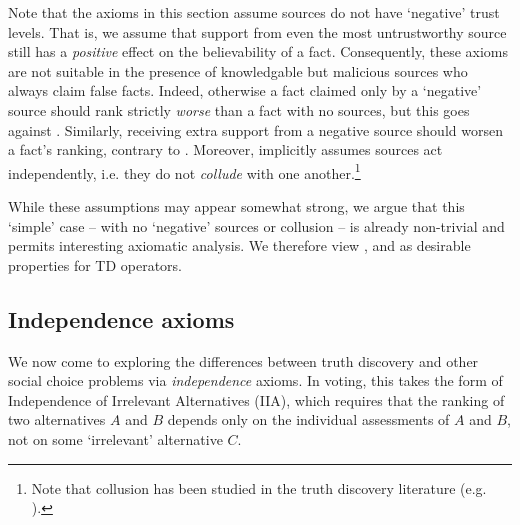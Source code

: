 Note that the axioms in this section assume sources do not have `negative'
trust levels. That is, we assume that support from even the most untrustworthy
source still has a \emph{positive} effect on the believability of a fact.
Consequently, these axioms are not suitable in the presence of knowledgable but
malicious sources who always claim false facts. Indeed, otherwise a fact
claimed only by a `negative' source should rank strictly \emph{worse} than a
fact with no sources, but this goes against \groundedness{}. Similarly, receiving
extra support from a negative source should worsen a fact's ranking, contrary
to \monotonicity{}. Moreover, \monotonicity{} implicitly assumes sources act
independently, i.e. they do not \emph{collude} with one another.\footnote{Note
that collusion has been studied in the truth discovery literature (e.g.
\cite{dong2009integrating,balakrishnan2011sourcerank,dong_truth_2009}).}

While these assumptions may appear somewhat strong, we argue that this `simple'
case -- with no `negative' sources or collusion -- is already non-trivial and
permits interesting axiomatic analysis.
%
We therefore view \unanimity{}, \groundedness{} and \monotonicity{} as desirable
properties for TD operators.

\subsection{Independence axioms}
\label{td_sec_indep_axioms}


We now come to exploring the differences between truth discovery and other
social choice problems via \emph{independence} axioms. In voting,
this takes the form of Independence of Irrelevant Alternatives (IIA), which
requires that the ranking of two alternatives $A$ and $B$ depends only on the
individual assessments of $A$ and $B$, not on some `irrelevant' alternative
$C$.

